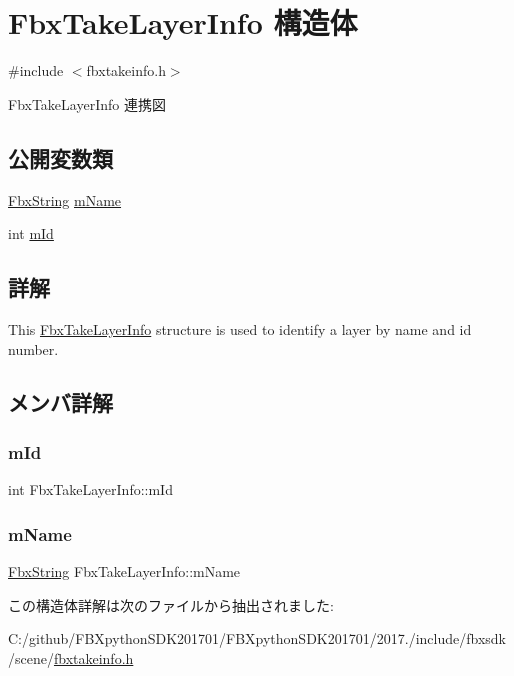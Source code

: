 \hypertarget{struct_fbx_take_layer_info}{}\section{Fbx\+Take\+Layer\+Info 構造体}
\label{struct_fbx_take_layer_info}


{\ttfamily \#include $<$fbxtakeinfo.\+h$>$}



Fbx\+Take\+Layer\+Info 連携図
\subsection*{公開変数類}
\begin{DoxyCompactItemize}
\item 
\hyperlink{class_fbx_string}{Fbx\+String} \hyperlink{struct_fbx_take_layer_info_ab011b0f1687904124235aeab266fb769}{m\+Name}
\item 
int \hyperlink{struct_fbx_take_layer_info_ab4c39cd8342a60caa1fb33686f5ac98c}{m\+Id}
\end{DoxyCompactItemize}


\subsection{詳解}
This \hyperlink{struct_fbx_take_layer_info}{Fbx\+Take\+Layer\+Info} structure is used to identify a layer by name and id number. 

\subsection{メンバ詳解}
\mbox{\label{struct_fbx_take_layer_info_ab4c39cd8342a60caa1fb33686f5ac98c}} 
\subsubsection{\texorpdfstring{m\+Id}{mId}}
{\footnotesize\ttfamily int Fbx\+Take\+Layer\+Info\+::m\+Id}

\mbox{\label{struct_fbx_take_layer_info_ab011b0f1687904124235aeab266fb769}} 
\subsubsection{\texorpdfstring{m\+Name}{mName}}
{\footnotesize\ttfamily \hyperlink{class_fbx_string}{Fbx\+String} Fbx\+Take\+Layer\+Info\+::m\+Name}



この構造体詳解は次のファイルから抽出されました\+:\begin{DoxyCompactItemize}
\item 
C\+:/github/\+F\+B\+Xpython\+S\+D\+K201701/\+F\+B\+Xpython\+S\+D\+K201701/2017./include/fbxsdk/scene/\hyperlink{fbxtakeinfo_8h}{fbxtakeinfo.\+h}\end{DoxyCompactItemize}
